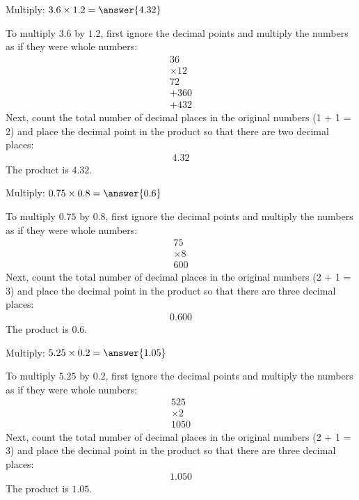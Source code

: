 \documentclass{ximera}
\begin{document}
\begin{problem}
Multiply: $3.6 \times 1.2 = \answer{4.32}$
\begin{feedback}
To multiply $3.6$ by $1.2$, first ignore the decimal points and multiply the numbers as if they were whole numbers:
\begin{align*}
   36 \\
\times   12 \\
\hline
   72 \\
+360 \\
\hline
+432
\end{align*}
Next, count the total number of decimal places in the original numbers (1 + 1 = 2) and place the decimal point in the product so that there are two decimal places:
\begin{align*}
   4.32
\end{align*}
The product is $4.32$.
\end{feedback}
\end{problem}

\begin{problem}
Multiply: $0.75 \times 0.8 = \answer{0.6}$
\begin{feedback}
To multiply $0.75$ by $0.8$, first ignore the decimal points and multiply the numbers as if they were whole numbers:
\begin{align*}
   75 \\
\times   8 \\
\hline
   600
\end{align*}
Next, count the total number of decimal places in the original numbers (2 + 1 = 3) and place the decimal point in the product so that there are three decimal places:
\begin{align*}
   0.600
\end{align*}
The product is $0.6$.
\end{feedback}
\end{problem}

\begin{problem}
Multiply: $5.25 \times 0.2 = \answer{1.05}$
\begin{feedback}
To multiply $5.25$ by $0.2$, first ignore the decimal points and multiply the numbers as if they were whole numbers:
\begin{align*}
   525 \\
\times   2 \\
\hline
   1050
\end{align*}
Next, count the total number of decimal places in the original numbers (2 + 1 = 3) and place the decimal point in the product so that there are three decimal places:
\begin{align*}
   1.050
\end{align*}
The product is $1.05$.
\end{feedback}
\end{problem}
\end{document}
